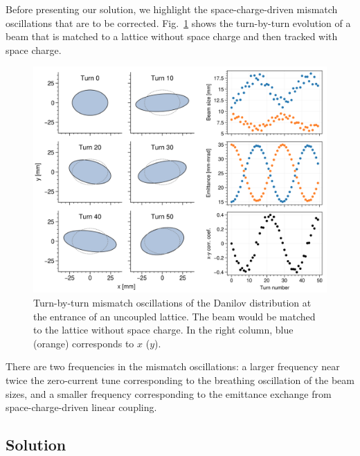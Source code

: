 Before presenting our solution, we highlight the space-charge-driven mismatch oscillations that are to be corrected. Fig.~\ref{fig:fodo_mismatch_tbt} shows the turn-by-turn evolution of a beam that is matched to a lattice without space charge and then tracked with space charge. 
%
\begin{figure}[!p]
    \centering
    \includegraphics[width=\textwidth]{Images/chapter2/fodo_mismatch_tbt.png}
    \caption{Turn-by-turn mismatch oscillations of the Danilov distribution at the entrance of an uncoupled lattice. The beam would be matched to the lattice without space charge. In the right column, blue (orange) corresponds to $x$ ($y$).}
    \label{fig:fodo_mismatch_tbt}
\end{figure}
%
There are two frequencies in the mismatch oscillations: a larger frequency near twice the zero-current tune corresponding to the breathing oscillation of the beam sizes, and a smaller frequency corresponding to the emittance exchange from space-charge-driven linear coupling. 


\subsection{Solution}

